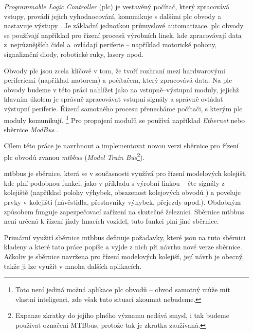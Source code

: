 \textit{Programmable Logic Controller} (\gls{plc}) je vestavěný počítač,
který zpracovává vstupy, provádí jejich vyhodnocování, komunikuje s dalšími
\gls{plc} obvody a nastavuje výstupy \cite{plc:web}. Je základní jednotkou průmyslové
automatizace. \gls{plc} obvody se používají například pro řízení procesů
výrobních linek, kde zpracovávají data z~nejrůznějších čidel a~ovládají
periferie – například motorické pohony, signalizační diody, robotické ruky,
lasery apod.

Obvody \gls{plc} jsou zcela klíčové v tom, že tvoří rozhraní mezi hardwarovými
periferiemi (například motorem) a počítačem, který zpracovává data. Na
\gls{plc} obvody budeme v této práci nahlížet jako na vstupně–výstupní moduly,
jejichž hlavním úkolem je správně zpracovávat vstupní signály a správně ovládat
výstupní periferie. Řízení samotného procesu přenecháme počítači, s kterým
\gls{plc} moduly komunikují. \footnote{Toto není jediná možná aplikace \gls{plc}
obvodů – obvod samotný může mít vlastní inteligenci, zde však tuto situaci
zkoumat nebudeme.} Pro propojení modulů se používá například \textit{Ethernet}
nebo sběrnice \textit{ModBus} \cite{modbus:web}.

Cílem této práce je navrhnout a implementovat novou verzi sběrnice pro řízení
\gls{plc} obvodů zvanou \textit{\gls{mtbbus}} (\textit{Model Train
Bus}\footnote{Expanze zkratky do jejího plného významu nedává smysl, i tak
budeme používat označení MTBbus, protože tak je zkratka zaužívaná.}).

\gls{mtbbus} je sběrnice, která se v současnosti využívá pro řízení modelových
kolejišť, kde plní podobnou funkci, jako v příkladu s výrobní linkou – čte
signály z kolejiště (například polohy výhybek, obsazenost kolejových obvodů
\cite{ko:web}) a poveluje prvky v kolejišti (návěstidla, přestavníky výhybek,
přejezdy apod.). Obdobným způsobem funguje zapezpečovací zařízení na skutečné
železnici. Sběrnice \gls{mtbbus} není určená k řízení jízdy hnacích vozidel,
tuto funkci plní jiné sběrnice.

Primární využití sběrnice \gls{mtbbus} definuje požadavky, které jsou na tuto sběrnici
kladeny a které tato práce popíše a vyjde z nich při návrhu nové verze sběrnice.
Ačkoliv je sběrnice navržena pro řízení modelových kolejišť, její návrh je
obecný, takže ji lze využít v mnoha dalších aplikacích.
